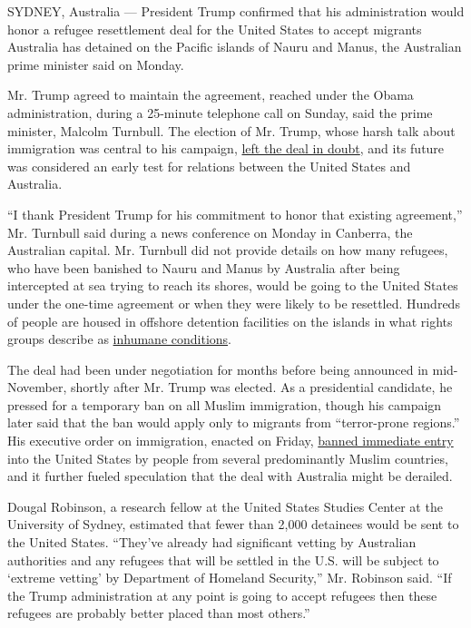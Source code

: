 SYDNEY, Australia --- President Trump confirmed that his administration
would honor a refugee resettlement deal for the United States to accept
migrants Australia has detained on the Pacific islands of Nauru and
Manus, the Australian prime minister said on Monday.

Mr. Trump agreed to maintain the agreement, reached under the Obama
administration, during a 25-minute telephone call on Sunday, said the
prime minister, Malcolm Turnbull. The election of Mr. Trump, whose harsh
talk about immigration was central to his campaign,
\href{https://www.nytimes.com/2016/11/18/world/australia/australia-us-refugee-deal.html}{left
the deal in doubt}, and its future was considered an early test for
relations between the United States and Australia.

``I thank President Trump for his commitment to honor that existing
agreement,'' Mr. Turnbull said during a news conference on Monday in
Canberra, the Australian capital. Mr. Turnbull did not provide details
on how many refugees, who have been banished to Nauru and Manus by
Australia after being intercepted at sea trying to reach its shores,
would be going to the United States under the one-time agreement or when
they were likely to be resettled. Hundreds of people are housed in
offshore detention facilities on the islands in what rights groups
describe as
\href{https://www.nytimes.com/2016/04/27/world/australia/papua-new-guinea-asylum-seeker.html}{inhumane
conditions}.

The deal had been under negotiation for months before being announced in
mid-November, shortly after Mr. Trump was elected. As a presidential
candidate, he pressed for a temporary ban on all Muslim immigration,
though his campaign later said that the ban would apply only to migrants
from ``terror-prone regions.'' His executive order on immigration,
enacted on Friday,
\href{https://www.nytimes.com/2017/01/27/us/politics/trump-syrian-refugees.html}{banned
immediate entry} into the United States by people from several
predominantly Muslim countries, and it further fueled speculation that
the deal with Australia might be derailed.

Dougal Robinson, a research fellow at the United States Studies Center
at the University of Sydney, estimated that fewer than 2,000 detainees
would be sent to the United States. ``They've already had significant
vetting by Australian authorities and any refugees that will be settled
in the U.S. will be subject to `extreme vetting' by Department of
Homeland Security,'' Mr. Robinson said. ``If the Trump administration at
any point is going to accept refugees then these refugees are probably
better placed than most others.''

